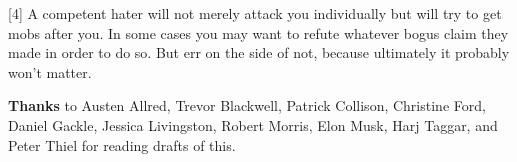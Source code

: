 [4] A competent hater will not merely attack
                  you individually but will try to get mobs after you. In some
                  cases you may want to refute whatever bogus claim they made in
                  order to do so. But err on the side of not, because ultimately
                  it probably won't matter.



\textbf{Thanks} to Austen Allred, Trevor Blackwell, Patrick
                    Collison, Christine Ford, Daniel Gackle, Jessica Livingston,
                    Robert Morris, Elon Musk, Harj Taggar, and Peter Thiel for
                    reading drafts of this.


              
            
          
